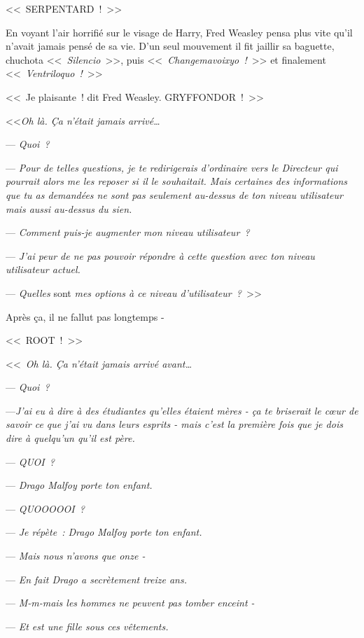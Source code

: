 \later

<<~SERPENTARD~!~>>

En voyant l'air horrifié sur le visage de Harry, Fred Weasley pensa plus vite qu'il n'avait jamais pensé de sa vie. D'un seul mouvement il fit jaillir sa baguette, chuchota <<~\emph{Silencio}~>>, puis <<~\emph{Changemavoixyo~!}~>> et finalement <<~\emph{Ventriloquo~!}~>>

<<~Je plaisante~! dit Fred Weasley. GRYFFONDOR~!~>>

\later

<<\emph{Oh là. Ça n'était jamais arrivé…}

--- \emph{Quoi~?}

--- \emph{Pour de telles questions, je te redirigerais d'ordinaire vers le Directeur qui pourrait alors me les reposer si il le souhaitait. Mais certaines des informations que tu as demandées ne sont pas seulement au-dessus de ton niveau utilisateur mais aussi au-dessus du sien.}

--- \emph{Comment puis-je augmenter mon niveau utilisateur~?}

--- \emph{J'ai peur de ne pas pouvoir répondre à cette question avec ton niveau utilisateur actuel.}

--- \emph{Quelles} sont \emph{mes options à ce niveau d'utilisateur~?}~>>

Après ça, il ne fallut pas longtemps -

<<~ROOT~!~>>

\later

<<~\emph{Oh là. Ça n'était jamais arrivé avant…}

--- \emph{Quoi~?}

---\emph{J'ai eu à dire à des étudiantes qu'elles étaient mères - ça te briserait le cœur de savoir ce que j'ai vu dans leurs esprits - mais c'est la première fois que je dois dire à quelqu'un qu'il est père.}

--- \emph{QUOI~?}

--- \emph{Drago Malfoy porte ton enfant.}

--- \emph{QUOOOOOI~?}

--- \emph{Je répète~: Drago Malfoy porte ton enfant.}

--- \emph{Mais nous n'avons que onze -}

--- \emph{En fait Drago a secrètement treize ans.}

--- \emph{M-m-mais les hommes ne peuvent pas tomber enceint -}

--- \emph{Et est une fille sous ces vêtements.}

